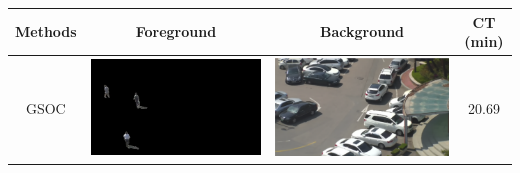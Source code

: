 \documentclass[11pt]{hyu_thesis}
\begin{document}
\begin{table}\ContinuedFloat
	\centering
	\begin{tabular}{cccc}
		\hline\hline
		Methods & Foreground & Background & CT (min) \\
		\hline\hline
		GSOC & \parbox[c]{0.35\linewidth}{\includegraphics[width=\linewidth]{bgm-fg-GSOC.png}} & \parbox[c]{0.35\linewidth}{\includegraphics[width=\linewidth]{bgm-bg-GSOC.png}} & 20.69 \\
		\hline\hline

\end{tabular}
\end{table}
\end{document}
